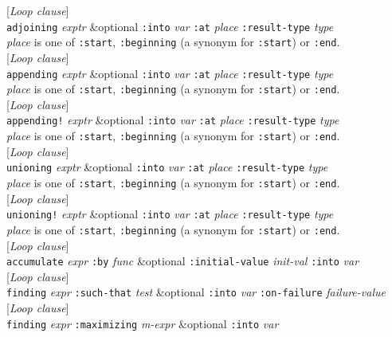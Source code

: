 \documentclass[10pt]{book}
\newenvironment{defother}[2]{[\textit{#1}]\\\texttt{#2}}{\\}
\begin{document}
\begin{defother}{Loop clause}{adjoining} \textit{exptr} \&optional \texttt{:into} \textit{var} \texttt{:at} \textit{place} \texttt{:result-type} \textit{type}\\ \textit{place} is one of \texttt{:start}, \texttt{:beginning} (a synonym for \texttt{:start}) or \texttt{:end}.\end{defother}
\begin{defother}{Loop clause}{appending} \textit{exptr} \&optional \texttt{:into} \textit{var} \texttt{:at} \textit{place} \texttt{:result-type} \textit{type}\\ \textit{place} is one of \texttt{:start}, \texttt{:beginning} (a synonym for \texttt{:start}) or \texttt{:end}.\end{defother}
\begin{defother}{Loop clause}{appending!} \textit{exptr} \&optional \texttt{:into} \textit{var} \texttt{:at} \textit{place} \texttt{:result-type} \textit{type}\\ \textit{place} is one of \texttt{:start}, \texttt{:beginning} (a synonym for \texttt{:start}) or \texttt{:end}.\end{defother}
\begin{defother}{Loop clause}{unioning} \textit{exptr} \&optional \texttt{:into} \textit{var} \texttt{:at} \textit{place} \texttt{:result-type} \textit{type}\\ \textit{place} is one of \texttt{:start}, \texttt{:beginning} (a synonym for \texttt{:start}) or \texttt{:end}.\end{defother}
\begin{defother}{Loop clause}{unioning!} \textit{exptr} \&optional \texttt{:into} \textit{var} \texttt{:at} \textit{place} \texttt{:result-type} \textit{type}\\ \textit{place} is one of \texttt{:start}, \texttt{:beginning} (a synonym for \texttt{:start}) or \texttt{:end}.\end{defother}
\begin{defother}{Loop clause}{accumulate} \textit{expr} \texttt{:by} \textit{func} \&optional \texttt{:initial-value} \textit{init-val} \texttt{:into} \textit{var}\end{defother}
\begin{defother}{Loop clause}{finding} \textit{expr} \texttt{:such-that} \textit{test} \&optional \texttt{:into} \textit{var} \texttt{:on-failure} \textit{failure-value}\end{defother}
\begin{defother}{Loop clause}{finding} \textit{expr} \texttt{:maximizing} \textit{m-expr} \&optional \texttt{:into} \textit{var}\end{defother}
\end{document}
